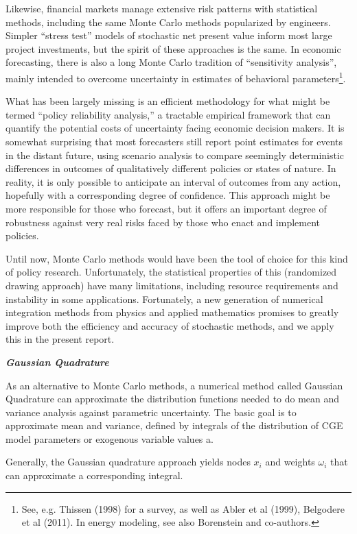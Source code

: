 \documentclass[12pt]{article}
\begin{document}
Likewise, financial markets manage extensive risk patterns with statistical methods, including the same Monte Carlo methods popularized by engineers. Simpler “stress test” models of stochastic net present value inform most large project investments, but the spirit of these approaches is the same. In economic forecasting, there is also a long Monte Carlo tradition of “sensitivity analysis”, mainly intended to overcome uncertainty in estimates of behavioral parameters\footnote{ See, e.g. Thissen (1998) for a survey, as well as Abler et al (1999), Belgodere et al (2011). In energy modeling, see also Borenstein and co-authors.}.

What has been largely missing is an efficient methodology for what might be termed “policy reliability analysis,” a tractable empirical framework that can quantify the potential costs of uncertainty facing economic decision makers. It is somewhat surprising that most forecasters still report point estimates for events in the distant future, using scenario analysis to compare seemingly deterministic differences in outcomes of qualitatively different policies or states of nature. In reality, it is only possible to anticipate an interval of outcomes from any action, hopefully with a corresponding degree of confidence. This approach might be more responsible for those who forecast, but it offers an important degree of robustness against very real risks faced by those who enact and implement policies.

Until now, Monte Carlo methods would have been the tool of choice for this kind of policy research. Unfortunately, the statistical properties of this (randomized drawing approach) have many limitations, including resource requirements and instability in some applications. Fortunately, a new generation of numerical integration methods from physics and applied mathematics promises to greatly improve both the efficiency and accuracy of stochastic methods, and we apply this in the present report.

\textbf{\textit{Gaussian Quadrature}}

As an alternative to Monte Carlo methods, a numerical method called Gaussian Quadrature can approximate the distribution functions needed to do mean and variance analysis against parametric uncertainty. The basic goal is to approximate mean and variance, defined by integrals of the distribution of CGE model parameters or exogenous variable values a.

Generally, the Gaussian quadrature approach yields nodes $x_i$ and weights $\omega_i$ that can approximate a corresponding integral.
\end{document}
